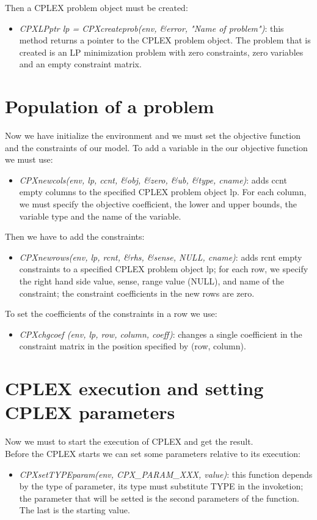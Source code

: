 \begin{appendices}
Then a \textsc{CPLEX} problem object must be created:
\begin{itemize}
\item \textit{CPXLPptr lp = CPXcreateprob(env, \&error, "Name of problem")}: this method returns a pointer to the \textsc{CPLEX} problem object. The problem that is created is an LP minimization problem with zero constraints, zero variables and an empty constraint matrix.
\end{itemize}

\section{Population of a problem}
Now we have initialize the environment and we must set the objective function and the constraints of our model.
To add a variable in the our objective function we must use:
\begin{itemize}
\item \textit{CPXnewcols(env, lp, ccnt, \&obj, \&zero, \&ub, \&type, cname)}: adds ccnt empty columns to the specified \textsc{CPLEX} problem object lp. For each column, we must specify the objective coefficient, the lower and upper bounds, the variable type and the name of the variable.
\end{itemize}

Then we have to add the constraints:
\begin{itemize}
\item \textit{CPXnewrows(env, lp, rcnt, \&rhs, \&sense, NULL, cname)}: adds rcnt empty constraints to a specified \textsc{CPLEX} problem object lp; for each row, we specify the right hand side value, sense, range value (NULL), and name of the constraint; the constraint coefficients in the new rows are zero.
\end{itemize}

To set the coefficients of the constraints in a row we use:
\begin{itemize}
\item \textit{CPXchgcoef (env, lp, row, column, coeff)}: changes a single coefficient in the constraint matrix in the position specified by (row, column).
\end{itemize}

\section{\textsc{CPLEX} execution and setting \textsc{CPLEX} parameters}
Now we must to start the execution of \textsc{CPLEX} and get the result.\\
Before the \textsc{CPLEX} starts we can set some parameters relative to its execution:
\begin{itemize}
\item \textit{CPXsetTYPEparam(env, CPX\_PARAM\_XXX, value)}: this function depends by the type of parameter, its type must substitute TYPE in the invoketion; the parameter that will be setted  is the second parameters of the function. The last is the starting value.
\end{itemize}


\end{appendices}
